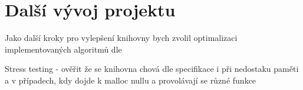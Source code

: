 \section{Další vývoj projektu}

Jako další kroky pro vylepšení knihovny bych zvolil optimalizaci implementovaných algoritmů dle

Stress testing
- ověřit že se knihovna chová dle specifikace i při nedostaku paměti a v případech, kdy dojde k malloc nullu
a provolávají se různé funkce

